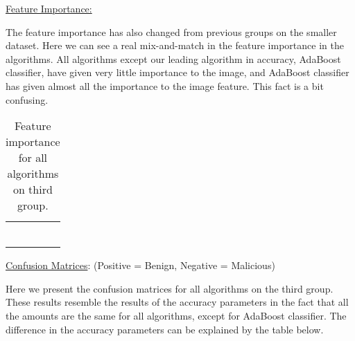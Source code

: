\documentclass{article}
\begin{document}
\noindent\underline{Feature Importance:}

\indent	The feature importance has also changed from previous groups on the smaller dataset. Here we can see a real mix-and-match in the feature importance in the algorithms. All algorithms except our leading algorithm in accuracy, AdaBoost classifier, have given very little importance to the image, and AdaBoost classifier has given almost all the importance to the image feature. This fact is a bit confusing.

\clearpage
\newpage

\begin{table}[htb]
\centering
\begin{tabular}{|M{2.5cm}|M{2.5cm}|M{2.5cm}|M{2.5cm}|}
	\hline
	\centering{} &  &  & \tabularnewline
	\hline
	 &  &  & \tabularnewline
	\hline
	 &  &  & \tabularnewline
	\hline
	 &  &  & \tabularnewline
	\hline
	 &  &  & \tabularnewline
	\hline
	 &  &  & \tabularnewline
	\hline
	 &  &  & \tabularnewline
	\hline	
\end{tabular}
\caption{Feature importance for all algorithms on third group.}
\end{table}

\noindent\underline{Confusion Matrices}: (Positive = Benign, Negative = Malicious)

\indent Here we present the confusion matrices for all algorithms on the third group. These results resemble the results of the accuracy parameters in the fact that all the amounts are the same for all algorithms, except for AdaBoost classifier. The difference in the accuracy parameters can be explained by the table below.

\clearpage
\newpage
\end{document}
